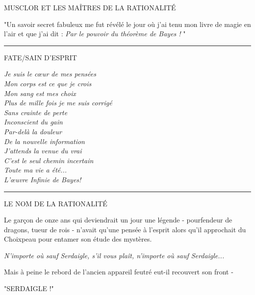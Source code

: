 \begin{center}MUSCLOR ET LES MAÎTRES DE LA RATIONALITÉ\end{center}


"Un savoir secret fabuleux me fut révélé le jour où j'ai tenu mon livre de magie en l'air et que j'ai dit : \emph{Par le pouvoir du théorème de Bayes !} "
\par\noindent\rule{\textwidth}{0.4pt}

\begin{center}FATE/SAIN D'ESPRIT\end{center}



\begin{center}\emph{Je suis le cœur de mes pensées} \\\emph{} \emph{Mon corps est ce que je crois} \\\emph{} \emph{Mon sang est mes choix} \\\emph{} \emph{Plus de mille fois je me suis corrigé} \\\emph{} \emph{Sans crainte de perte} \\\emph{} \emph{Inconscient du gain} \\\emph{} \emph{Par-delà la douleur} \\\emph{} \emph{De la nouvelle information} \\\emph{} \emph{J'attends la venue du vrai} \\\emph{} \emph{C'est le seul chemin incertain} \\\emph{} \emph{Toute ma vie a été...} \\\emph{} \emph{L'œuvre Infinie de Bayes!} \end{center}

\par\noindent\rule{\textwidth}{0.4pt}

\begin{center}LE NOM DE LA RATIONALITÉ\end{center}


Le garçon de onze ans qui deviendrait un jour une légende - pourfendeur de dragons, tueur de rois - n'avait qu'une pensée à l'esprit alors qu'il approchait du Choixpeau pour entamer son étude des mystères.

\emph{N'importe où sauf Serdaigle, s'il vous plaît, n'importe où sauf Serdaigle...} 

Mais à peine le rebord de l'ancien appareil feutré eut-il recouvert son front -

"SERDAIGLE !"

